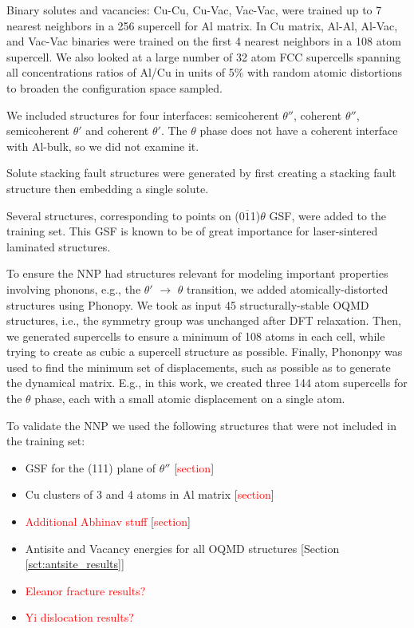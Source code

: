 \documentclass{article}
\begin{document}
Binary solutes and vacancies: Cu-Cu, Cu-Vac, Vac-Vac, were trained up to 7 nearest neighbors in a 256 supercell for Al matrix. 
In Cu matrix, Al-Al, Al-Vac, and Vac-Vac binaries were trained on the first 4 nearest neighbors in a 108 atom supercell. 
We also looked at a large number of 32 atom FCC supercells spanning all concentrations ratios of Al/Cu in units of 5\%  with random atomic distortions to broaden the configuration space sampled.

We included structures for four interfaces: semicoherent $\theta''$, coherent $\theta''$,
semicoherent $\theta'$ and coherent $\theta'$. The $\theta$ phase does not have a coherent interface\cite{Nie2014PhysicalAlloys} with Al-bulk, so we did not examine it.

Solute stacking fault structures were generated by first creating a stacking fault structure then embedding a single solute.

Several structures, corresponding to points on (0$\overline{1}$1)$\theta$ GSF, were added to the training set. 
This GSF is known to be of great importance for laser-sintered laminated structures\cite{Wang2018}.

To ensure the NNP had structures relevant for modeling important properties involving phonons, e.g., the $\theta'$ $\rightarrow$ $\theta$ transition, we added atomically-distorted structures using Phonopy\cite{Togo2015FirstScience}.
We took as input 45 structurally-stable OQMD structures, i.e., the symmetry group was unchanged after DFT relaxation.
Then, we generated supercells to ensure a minimum of 108 atoms in each cell, while trying to create as cubic a supercell structure as possible.
Finally, Phononpy was used to find the minimum set of displacements, such as possible as to generate the dynamical matrix.
E.g., in this work, we created three 144 atom supercells for the $\theta$ phase, each with a small atomic displacement on a single atom.



To validate the NNP we used the following structures that were not included in the training set:
\begin{itemize}
    \item GSF for the (111) plane of $\theta''$  [\textcolor{red}{section}]
    \item Cu clusters of 3 and 4 atoms in Al matrix [\textcolor{red}{section}] 
    \item \textcolor{red}{Additional Abhinav stuff} [\textcolor{red}{section}] 
    \item Antisite and Vacancy energies for all OQMD structures [Section \ref{sct:antsite_results}]
    \item \textcolor{red}{Eleanor fracture results?} 
    \item \textcolor{red}{Yi dislocation results?} 
\end{itemize}
\end{document}
